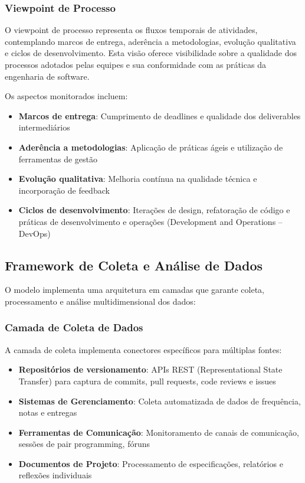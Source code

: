\documentclass[english, spanish, brazilian]{modelo_dt}
\begin{document}
\subsubsection{Viewpoint de Processo}

O viewpoint de processo representa os fluxos temporais de atividades,
contemplando marcos de entrega, aderência a metodologias, evolução qualitativa
e ciclos de desenvolvimento\@. Esta visão oferece visibilidade sobre a
qualidade dos processos adotados pelas equipes e sua conformidade com as
práticas da engenharia de software\@.

Os aspectos monitorados incluem:
\begin{itemize}
  \item \textbf{Marcos de entrega}: Cumprimento de deadlines e qualidade dos deliverables intermediários
  \item \textbf{Aderência a metodologias}: Aplicação de práticas ágeis e utilização de ferramentas de gestão
  \item \textbf{Evolução qualitativa}: Melhoria contínua na qualidade técnica e incorporação de feedback
  \item \textbf{Ciclos de desenvolvimento}: Iterações de design, refatoração de código e práticas de desenvolvimento e operações (Development and Operations -- DevOps)
\end{itemize}

\subsection{Framework de Coleta e Análise de Dados}

O modelo implementa uma arquitetura em camadas que garante coleta,
processamento e análise multidimensional dos dados:

\subsubsection{Camada de Coleta de Dados}

A camada de coleta implementa conectores específicos para múltiplas fontes:
\begin{itemize}
  \item \textbf{Repositórios de versionamento}: APIs REST (Representational State Transfer) para captura de commits, pull requests, code reviews e issues
  \item \textbf{Sistemas de Gerenciamento}: Coleta automatizada de dados de frequência, notas e entregas
  \item \textbf{Ferramentas de Comunicação}: Monitoramento de canais de comunicação, sessões de pair programming, fóruns
  \item \textbf{Documentos de Projeto}: Processamento de especificações, relatórios e reflexões individuais
\end{itemize}
\end{document}
